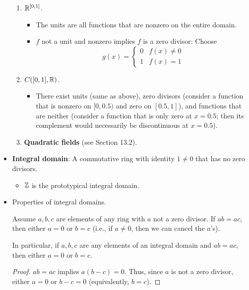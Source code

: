\documentclass[../notes.tex]{subfiles}
\begin{document}
\begin{itemize}
\begin{enumerate}
        \item $\mathbb{R}^{[0,1]}$.
        \begin{itemize}
            \item The units are all functions that are nonzero on the entire domain.
            \item $f$ not a unit and nonzero implies $f$ is a zero divisor: Choose
            \begin{equation*}
                g(x) =
                \begin{cases}
                    0 & f(x)\neq 0\\
                    1 & f(x)=1
                \end{cases}
            \end{equation*}
        \end{itemize}
        \item $C([0,1],\mathbb{R})$.
        \begin{itemize}
            \item There exist units (same as above), zero divisors (consider a function that is nonzero on $[0,0.5)$ and zero on $[0.5,1]$), and functions that are neither (consider a function that is only zero at $x=0.5$; then its complement would necessarily be discontinuous at $x=0.5$).
        \end{itemize}
        \item \textbf{Quadratic fields} (see Section 13.2).
    \end{enumerate}
    \item \textbf{Integral domain}: A commutative ring with identity $1\neq 0$ that has no zero divisors.
    \begin{itemize}
        \item $\mathbb{Z}$ is the prototypical integral domain.
    \end{itemize}
    \item Properties of integral domains.
    \begin{proposition}\label{prp:7.2}
        Assume $a,b,c$ are elements of any ring with $a$ not a zero divisor. If $ab=ac$, then either $a=0$ or $b=c$ (i.e., if $a\neq 0$, then we can cancel the $a$'s).\par
        In particular, if $a,b,c$ are any elements of an integral domain and $ab=ac$, then either $a=0$ or $b=c$.
        \begin{proof}
            $ab=ac$ implies $a(b-c)=0$. Thus, since $a$ is not a zero divisor, either $a=0$ or $b-c=0$ (equivalently, $b=c$).
        \end{proof}

\end{proposition}
\end{itemize}
\end{document}

